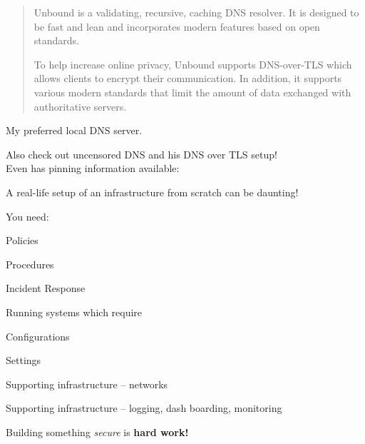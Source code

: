 \documentclass[Screen16to9,17pt]{foils}
\begin{document}

\begin{quote}
Unbound is a validating, recursive, caching DNS resolver. It is designed to be fast and lean and incorporates modern features based on open standards.

To help increase online privacy, Unbound supports DNS-over-TLS which allows clients to encrypt their communication. In addition, it supports various modern standards that limit the amount of data exchanged with authoritative servers.
\end{quote}


My preferred local DNS server.

Also check out uncensored DNS and his DNS over TLS setup!\\
Even has pinning information available:\\ {\small{}}




\begin{list1}
\item A real-life setup of an infrastructure from scratch can be daunting!
\item You need:
\begin{list2}
\item Policies
\item Procedures
\item Incident Response
\end{list2}
\item Running systems which require
\begin{list2}
\item Configurations
\item Settings
\item Supporting infrastructure -- networks
\item Supporting infrastructure -- logging, dash boarding, monitoring
\end{list2}
\item Building something \emph{secure} is {\bf hard work!}
\end{list1}




\end{document}
